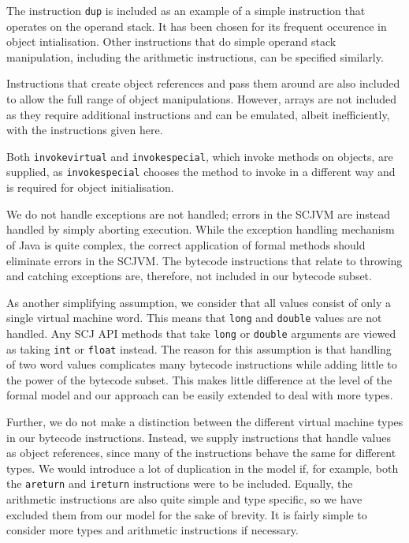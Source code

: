 \documentclass[a4paper,10pt]{report}
\begin{document}
The instruction \texttt{dup} is included as an example of a simple
instruction that operates on the operand stack.
It has been chosen for its frequent occurence in object intialisation.
Other instructions that do simple operand stack manipulation,
including the arithmetic instructions, can be specified similarly.

Instructions that create object references and pass them around are
also included to allow the full range of object manipulations.
However, arrays are not included as they require additional
instructions and can be emulated, albeit inefficiently, with the
instructions given here.

Both \texttt{invokevirtual} and \texttt{invokespecial}, which invoke
methods on objects, are supplied, as \texttt{invokespecial} chooses
the method to invoke in a different way and is required for object
initialisation.

We do not handle exceptions are not handled; errors in the SCJVM are
instead handled by simply aborting execution.
While the exception handling mechanism of Java is quite complex, the
correct application of formal methods should eliminate errors in the
SCJVM.
The bytecode instructions that relate to throwing and catching
exceptions are, therefore, not included in our bytecode subset.

As another simplifying assumption, we consider that all values consist
of only a single virtual machine word.
This means that \texttt{long} and \texttt{double} values are not
handled.
Any SCJ API methods that take \texttt{long} or \texttt{double}
arguments are viewed as taking \texttt{int} or \texttt{float} instead.
The reason for this assumption is that handling of two word values
complicates many bytecode instructions while adding little to the
power of the bytecode subset.
This makes little difference at the level of the formal model and our
approach can be easily extended to deal with more types.

Further, we do not make a distinction between the different virtual
machine types in our bytecode instructions.
Instead, we supply instructions that handle values as object
references, since many of the instructions behave the same for
different types.
We would introduce a lot of duplication in the model if, for example,
both the \texttt{areturn} and \texttt{ireturn} instructions were to be
included.
Equally, the arithmetic instructions are also quite simple and type
specific, so we have excluded them from our model for the sake of
brevity.
It is fairly simple to consider more types and arithmetic instructions
if necessary.
\end{document}
